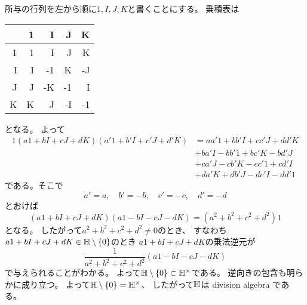 \documentclass[report]{jlreq}
\begin{document}
\begin{answer}
    所与の行列を左から順に$1, I, J, K$と書くことにする。
    乗積表は
    \begin{center}
        \begin{tabular}{R|RRRR}
              & 1 & I & J & K \\  & 1 & I & J & K \\
            I & I & -1 & K & -J \\
            J & J & -K & -1 & I \\
            K & K & J & -I & -1
        \end{tabular}
    \end{center}
    となる。
    よって
    \begin{alignat*}{1}
        (a1 + bI + cJ + dK)(a'1 + b'I + c'J + d'K)
            &= aa'1 + bb'I + cc'J + dd'K \\
            &+ ba'I - bb'1 + bc'K - bd'J \\
            &+ ca'J - cb'K - cc'1 + cd'I \\
            &+ da'K + db'J - dc'I - dd'1
    \end{alignat*}
    である。そこで
    \begin{equation}
        a' = a,\quad
        b' = -b,\quad
        c' = -c,\quad
        d' = -d
    \end{equation}
    とおけば
    \begin{equation}
        (a1 + bI + cJ + dK)(a1 - bI - cJ - dK)
            = (a^2 + b^2 + c^2 + d^2) 1
    \end{equation}
    となる。
    したがって$a^2 + b^2 + c^2 + d^2 \neq 0$のとき、
    すなわち$a1 + bI + cJ + dK \in \mathbb{H} \setminus \{0\}$のとき
    $a1 + bI + cJ + dK$の乗法逆元が
    \begin{equation}
        \frac{1}{a^2 + b^2 + c^2 + d^2}
            (a1 - bI - cJ - dK)
    \end{equation}
    で与えられることがわかる。
    よって$\mathbb{H} \setminus \{0\} \subset \mathbb{H}^\times$である。
    逆向きの包含も明らかに成り立つ。
    よって$\mathbb{H} \setminus \{0\} = \mathbb{H}^\times$、
    したがって$\mathbb{H}$は division algebra である。
\end{answer}


\end{document}

